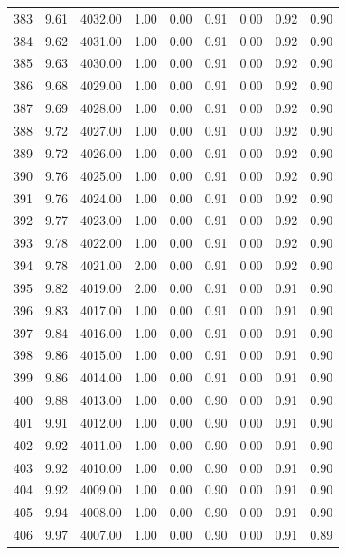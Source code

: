 \documentclass{article}\usepackage[]{graphicx}\usepackage[]{color}
\begin{document}
\begin{longtable}{rrrrrrrrr}
  383 & 9.61 & 4032.00 & 1.00 & 0.00 & 0.91 & 0.00 & 0.92 & 0.90 \\ 
  384 & 9.62 & 4031.00 & 1.00 & 0.00 & 0.91 & 0.00 & 0.92 & 0.90 \\ 
  385 & 9.63 & 4030.00 & 1.00 & 0.00 & 0.91 & 0.00 & 0.92 & 0.90 \\ 
  386 & 9.68 & 4029.00 & 1.00 & 0.00 & 0.91 & 0.00 & 0.92 & 0.90 \\ 
  387 & 9.69 & 4028.00 & 1.00 & 0.00 & 0.91 & 0.00 & 0.92 & 0.90 \\ 
  388 & 9.72 & 4027.00 & 1.00 & 0.00 & 0.91 & 0.00 & 0.92 & 0.90 \\ 
  389 & 9.72 & 4026.00 & 1.00 & 0.00 & 0.91 & 0.00 & 0.92 & 0.90 \\ 
  390 & 9.76 & 4025.00 & 1.00 & 0.00 & 0.91 & 0.00 & 0.92 & 0.90 \\ 
  391 & 9.76 & 4024.00 & 1.00 & 0.00 & 0.91 & 0.00 & 0.92 & 0.90 \\ 
  392 & 9.77 & 4023.00 & 1.00 & 0.00 & 0.91 & 0.00 & 0.92 & 0.90 \\ 
  393 & 9.78 & 4022.00 & 1.00 & 0.00 & 0.91 & 0.00 & 0.92 & 0.90 \\ 
  394 & 9.78 & 4021.00 & 2.00 & 0.00 & 0.91 & 0.00 & 0.92 & 0.90 \\ 
  395 & 9.82 & 4019.00 & 2.00 & 0.00 & 0.91 & 0.00 & 0.91 & 0.90 \\ 
  396 & 9.83 & 4017.00 & 1.00 & 0.00 & 0.91 & 0.00 & 0.91 & 0.90 \\ 
  397 & 9.84 & 4016.00 & 1.00 & 0.00 & 0.91 & 0.00 & 0.91 & 0.90 \\ 
  398 & 9.86 & 4015.00 & 1.00 & 0.00 & 0.91 & 0.00 & 0.91 & 0.90 \\ 
  399 & 9.86 & 4014.00 & 1.00 & 0.00 & 0.91 & 0.00 & 0.91 & 0.90 \\ 
  400 & 9.88 & 4013.00 & 1.00 & 0.00 & 0.90 & 0.00 & 0.91 & 0.90 \\ 
  401 & 9.91 & 4012.00 & 1.00 & 0.00 & 0.90 & 0.00 & 0.91 & 0.90 \\ 
  402 & 9.92 & 4011.00 & 1.00 & 0.00 & 0.90 & 0.00 & 0.91 & 0.90 \\ 
  403 & 9.92 & 4010.00 & 1.00 & 0.00 & 0.90 & 0.00 & 0.91 & 0.90 \\ 
  404 & 9.92 & 4009.00 & 1.00 & 0.00 & 0.90 & 0.00 & 0.91 & 0.90 \\ 
  405 & 9.94 & 4008.00 & 1.00 & 0.00 & 0.90 & 0.00 & 0.91 & 0.90 \\ 
  406 & 9.97 & 4007.00 & 1.00 & 0.00 & 0.90 & 0.00 & 0.91 & 0.89 \\ 

\end{longtable}
\end{document}
